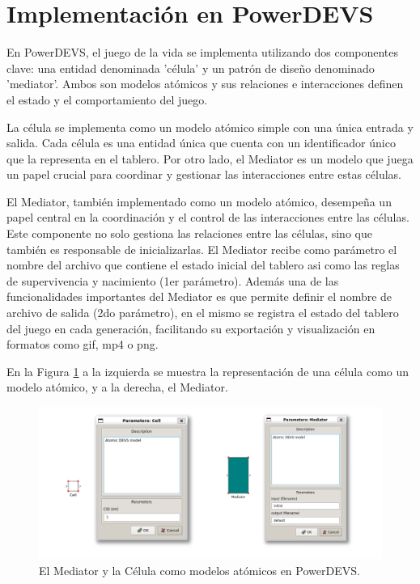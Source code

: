 \documentclass[]{article}
\begin{document}
\section{Implementación en PowerDEVS}
En PowerDEVS, el juego de la vida se implementa utilizando dos componentes clave: una entidad denominada 'célula' y un patrón de diseño denominado 'mediator'. Ambos son modelos atómicos y sus relaciones e interacciones definen el estado y el comportamiento del juego.

La célula se implementa como un modelo atómico simple con una única entrada y salida. Cada célula es una entidad única que cuenta con un identificador único que la representa en el tablero. Por otro lado, el Mediator es un modelo que juega un papel crucial para coordinar y gestionar las interacciones entre estas células.

El Mediator, también implementado como un modelo atómico, desempeña un papel central en la coordinación y el control de las interacciones entre las células. Este componente no solo gestiona las relaciones entre las células, sino que también es responsable de inicializarlas. El Mediator recibe como parámetro el nombre del archivo que contiene el estado inicial del tablero asi como las reglas de supervivencia y nacimiento (1er parámetro). Además una de las funcionalidades importantes del Mediator es que permite definir el nombre de archivo de salida (2do parámetro), en el mismo se registra el estado del tablero del juego en cada generación, facilitando su exportación y visualización en formatos como gif, mp4 o png.

En la Figura \ref{fig:cell_mediator} a la izquierda se muestra la representación de una célula como un modelo atómico, y a la derecha, el Mediator.

\begin{figure}[H]
  \centering
  \includegraphics[width=1\textwidth]{../assets/pdevs/mediator_cell.png}
  \caption{El Mediator y la Célula como modelos atómicos en PowerDEVS.}
  \label{fig:cell_mediator}
\end{figure}
\end{document}
